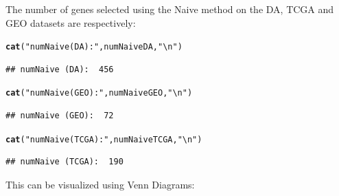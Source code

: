 \documentclass[a4paper,10pt]{article}\usepackage[]{graphicx}\usepackage[]{color}
\makeatletter
\newcommand{\hlstr}[1]{\textcolor[rgb]{0.192,0.494,0.8}{#1}}%
\newcommand{\hlstd}[1]{\textcolor[rgb]{0.345,0.345,0.345}{#1}}%
\newcommand{\hlkwd}[1]{\textcolor[rgb]{0.737,0.353,0.396}{\textbf{#1}}}%
\newenvironment{kframe}{%
 \def\at@end@of@kframe{}%
 \ifinner\ifhmode%
  \def\at@end@of@kframe{\end{minipage}}%
  \begin{minipage}{\columnwidth}%
 \fi\fi%
 \def\FrameCommand##1{\hskip\@totalleftmargin \hskip-\fboxsep
 \colorbox{shadecolor}{##1}\hskip-\fboxsep
     \hskip-\linewidth \hskip-\@totalleftmargin \hskip\columnwidth}%
 \MakeFramed {\advance\hsize-\width
   \@totalleftmargin\z@ \linewidth\hsize
   \@setminipage}}%
 {\par\unskip\endMakeFramed%
 \at@end@of@kframe}
\newenvironment{knitrout}{}{} %
\makeatother
\begin{document}
The number of genes selected using the Naive method on the DA, TCGA and GEO datasets are respectively:
\begin{knitrout}
\color{fgcolor}\begin{kframe}
\begin{alltt}
\hlkwd{cat}\hlstd{(}\hlstr{"numNaive (DA): "}\hlstd{, numNaiveDA,}\hlstr{"\textbackslash{}n"}\hlstd{)}
\end{alltt}
\begin{verbatim}
## numNaive (DA):  456
\end{verbatim}
\begin{alltt}
\hlkwd{cat}\hlstd{(}\hlstr{"numNaive (GEO): "}\hlstd{, numNaiveGEO,}\hlstr{"\textbackslash{}n"}\hlstd{)}
\end{alltt}
\begin{verbatim}
## numNaive (GEO):  72
\end{verbatim}
\begin{alltt}
\hlkwd{cat}\hlstd{(}\hlstr{"numNaive (TCGA): "}\hlstd{, numNaiveTCGA,}\hlstr{"\textbackslash{}n"}\hlstd{)}
\end{alltt}
\begin{verbatim}
## numNaive (TCGA):  190
\end{verbatim}
\end{kframe}
\end{knitrout}

This can be visualized using Venn Diagrams:
\end{document}
